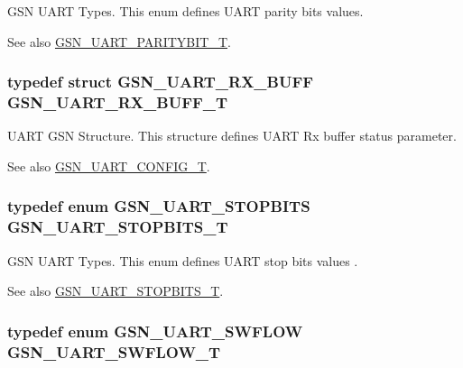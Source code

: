 GSN UART Types. This enum defines UART parity bits values. 

\begin{DoxySeeAlso}{See also}
\hyperlink{a00656_ga62f12eb4660a18fb77ba09b0625d0c8e}{GSN\_\-UART\_\-PARITYBIT\_\-T}. 
\end{DoxySeeAlso}
\hypertarget{a00656_ga9a87f35f38fefe3c4b6a3057aec9b10a}{
\subsubsection[{GSN\_\-UART\_\-RX\_\-BUFF\_\-T}]{\setlength{\rightskip}{0pt plus 5cm}typedef struct {\bf GSN\_\-UART\_\-RX\_\-BUFF}  {\bf GSN\_\-UART\_\-RX\_\-BUFF\_\-T}}}
\label{a00656_ga9a87f35f38fefe3c4b6a3057aec9b10a}


UART GSN Structure. This structure defines UART Rx buffer status parameter. 

\begin{DoxySeeAlso}{See also}
\hyperlink{a00656_gab793201a4cc37e8cf27b0b640b1f37bc}{GSN\_\-UART\_\-CONFIG\_\-T}. 
\end{DoxySeeAlso}
\hypertarget{a00656_gad24814e9f0d44d09137d1984c23155c1}{
\subsubsection[{GSN\_\-UART\_\-STOPBITS\_\-T}]{\setlength{\rightskip}{0pt plus 5cm}typedef enum {\bf GSN\_\-UART\_\-STOPBITS} {\bf GSN\_\-UART\_\-STOPBITS\_\-T}}}
\label{a00656_gad24814e9f0d44d09137d1984c23155c1}


GSN UART Types. This enum defines UART stop bits values . 

\begin{DoxySeeAlso}{See also}
\hyperlink{a00656_gad24814e9f0d44d09137d1984c23155c1}{GSN\_\-UART\_\-STOPBITS\_\-T}. 
\end{DoxySeeAlso}
\hypertarget{a00656_gae4fa00cd25fb7d023d1016b79b520542}{
\subsubsection[{GSN\_\-UART\_\-SWFLOW\_\-T}]{\setlength{\rightskip}{0pt plus 5cm}typedef enum {\bf GSN\_\-UART\_\-SWFLOW} {\bf GSN\_\-UART\_\-SWFLOW\_\-T}}}
\label{a00656_gae4fa00cd25fb7d023d1016b79b520542}


